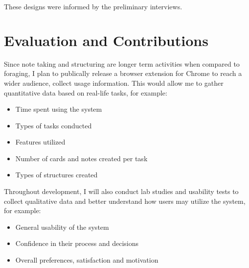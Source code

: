 These designs were informed by the preliminary interviews.

\section{Evaluation and Contributions}


Since note taking and structuring are longer term activities when compared to foraging, I plan to publically release a browser extension for Chrome to reach a wider audience, collect usage information. This would allow me to gather quantitative data based on real-life tasks, for example: 

\begin{itemize}
    \item Time spent using the system
    \item Types of tasks conducted
    \item Features utilized
    \item Number of cards and notes created per task
    \item Types of structures created
\end{itemize}

Throughout development, I will also conduct lab studies and usability tests to collect qualitative data and better understand how users may utilize the system, for example:

\begin{itemize}
    \item General usability of the system
    \item Confidence in their process and decisions
    \item Overall preferences, satisfaction and motivation
\end{itemize}

